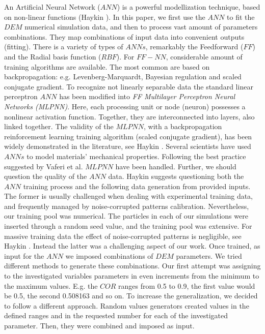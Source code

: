\documentclass[review]{elsarticle}
\begin{document}
\begin{appendix}
An Artificial Neural Network ($ANN$) is a powerful modellization technique, 
based on non-linear functions (Haykin \cite{RefWorks:158}). 
In this paper, we first use the $ANN$ to fit the $DEM$ numerical simulation data, 
and then to process vast amount of parameters combinations. 
They map combinations of input data into convenient outputs (fitting). 
There is a variety of types of $ANNs$, remarkably the Feedforward ($FF$) 
and the Radial basis function ($RBF$). For $FF-NN$, considerable amount 
of training algorithms are available. The most common are based on
backpropagation:
e.g. Levenberg-Marquardt, Bayesian regulation and scaled conjugate gradient. 
To recognize not linearly separable data the standard linear perceptron $ANN$ 
has been modified into \textit{FF Multilayer Perceptron Neural Networks (MLPNN)}. 
Here, each processing unit or node (neuron) possesses a nonlinear activation function. 
Together, they are interconnected into layers, also linked together. 
The validity of the $MLPNN$, with a backpropagation reinforcement learning 
training algorithm (scaled conjugate gradient), has been widely demonstrated in the 
literature, see Haykin \cite{RefWorks:158}. Several scientists 
\cite{RefWorks:161, RefWorks:166, RefWorks:167, RefWorks:168, RefWorks:169,
RefWorks:170, RefWorks:178, RefWorks:179} have used $ANNs$ to model materials'
mechanical properties.
Following the best practice suggested by Vaferi et al. \cite{RefWorks:150} $MLPNN$ have been handled.
Further, we should question the quality of the $ANN$ data. Haykin \cite{RefWorks:158} 
suggests questioning both the $ANN$ training process and the following data
generation from provided inputs.
The former is usually challenged when dealing with experimental training data, and frequently 
managed by noise-corrupted patterns calibration. Nevertheless, our training pool
was numerical.
The particles in each of our simulations were inserted through a random
seed value, and the training pool was extensive.
For massive training data the effect of noise-corrupted patterns is negligible, see Haykin \cite{RefWorks:158}. 
Instead the latter was a challenging aspect of our work. Once trained, as input for the $ANN$ we imposed 
combinations of $DEM$ parameters. 
We tried different methods to generate these combinations. 
Our first attempt was assigning to the investigated variables parameters in even increments 
from the minimum to the maximum values. 
E.g. the $COR$ ranges from 0.5 to 0.9, the first value would be 0.5, the second 0.508163 and so on. 
To increase the generalization, we decided to follow a different approach. 
Random values generators created values in the defined ranges and in the requested 
number for each of the investigated parameter. Then, they were combined and imposed as input.\\


\end{appendix}
\end{document}
